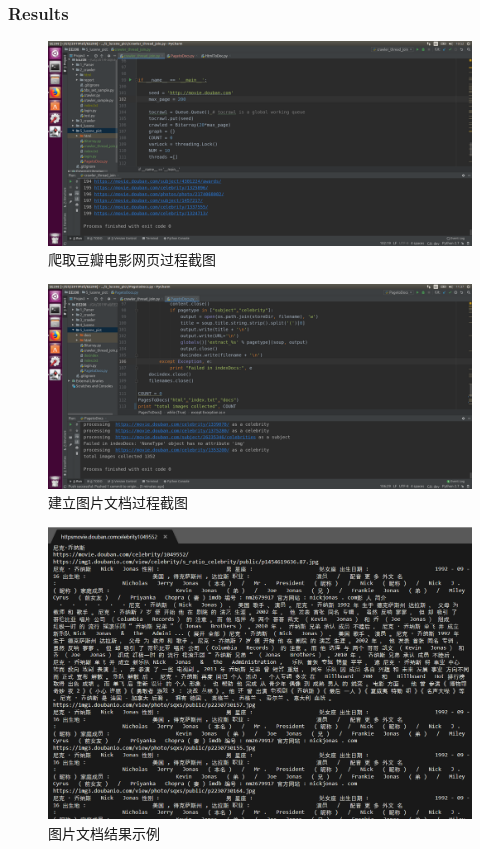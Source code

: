 \documentclass{article}
\begin{document}
\subsubsection{Results}

\begin{figure}[htbp]
\centering
\includegraphics[width=14.5cm]{img/crawl_images.png}
\caption{爬取豆瓣电影网页过程截图}
\label{fig:crawl_images}
\end{figure}

\begin{figure}[htbp]
\centering
\includegraphics[width=14.5cm]{img/getpict.png}
\caption{建立图片文档过程截图}
\label{fig:pagetodocs}
\end{figure}

\begin{figure}[htbp]
\centering
\includegraphics[width=14.5cm]{img/pictdocs.png}
\caption{图片文档结果示例}
\label{fig:docexample}
\end{figure}
\end{document}
